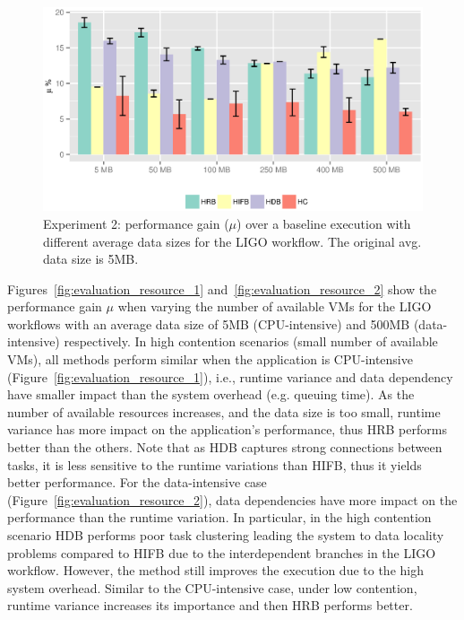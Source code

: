 \begin{figure}[!htb]
	\centering
    \includegraphics[width=0.8\linewidth]{figures/balance/figure21.eps}
    \caption{Experiment 2: performance gain ($\mu$) over a baseline execution with different average data sizes for the LIGO workflow. The original avg. data size is 5MB.}
    \label{fig:evaluation_datasize}
\end{figure}

Figures~\ref{fig:evaluation_resource_1} and~\ref{fig:evaluation_resource_2} show the performance gain $\mu$ when varying the number of available VMs for the LIGO workflows with an average data size of 5MB (CPU-intensive) and 500MB (data-intensive) respectively. In high contention scenarios (small number of available VMs), all methods perform similar when the application is CPU-intensive (Figure~\ref{fig:evaluation_resource_1}), i.e., runtime variance and data dependency have smaller impact than the system overhead (e.g. queuing time). As the number of available resources increases, and the data size is too small, runtime variance has more impact on the application's performance, thus HRB performs better than the others. Note that as HDB captures strong connections between tasks, it is less sensitive to the runtime variations than HIFB, thus it yields better performance. For the data-intensive case (Figure~\ref{fig:evaluation_resource_2}), data dependencies have more impact on the performance than the runtime variation. In particular, in the high contention scenario HDB performs poor task clustering leading the system to data locality problems compared to HIFB due to the interdependent branches in the LIGO workflow. However, the method still improves the execution due to the high system overhead. Similar to the CPU-intensive case, under low contention, runtime variance increases its importance and then HRB performs better.

